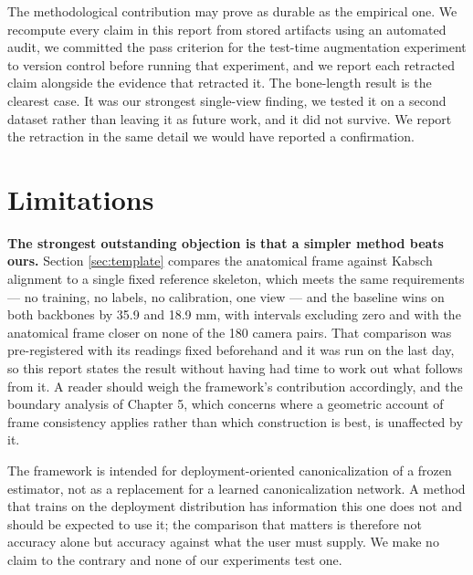 \documentclass[12pt,a4paper]{report}
\begin{document}
The methodological contribution may prove as durable as the empirical one. We recompute every claim in this report from stored artifacts using an automated audit, we committed the pass criterion for the test-time augmentation experiment to version control before running that experiment, and we report each retracted claim alongside the evidence that retracted it. The bone-length result is the clearest case. It was our strongest single-view finding, we tested it on a second dataset rather than leaving it as future work, and it did not survive. We report the retraction in the same detail we would have reported a confirmation.

\section*{Limitations}
\label{sec:limitations}

\textbf{The strongest outstanding objection is that a simpler method beats ours.} Section \ref{sec:template} compares the anatomical frame against Kabsch alignment to a single fixed reference skeleton, which meets the same requirements --- no training, no labels, no calibration, one view --- and the baseline wins on both backbones by 35.9 and 18.9 mm, with intervals excluding zero and with the anatomical frame closer on none of the 180 camera pairs. That comparison was pre-registered with its readings fixed beforehand and it was run on the last day, so this report states the result without having had time to work out what follows from it. A reader should weigh the framework's contribution accordingly, and the boundary analysis of Chapter 5, which concerns where a geometric account of frame consistency applies rather than which construction is best, is unaffected by it.

The framework is intended for deployment-oriented canonicalization of a frozen estimator, not as a replacement for a learned canonicalization network. A method that trains on the deployment distribution has information this one does not and should be expected to use it; the comparison that matters is therefore not accuracy alone but accuracy against what the user must supply. We make no claim to the contrary and none of our experiments test one.
\end{document}
